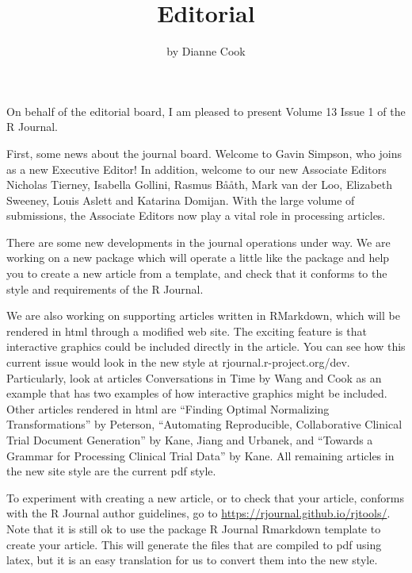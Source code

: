 \title{Editorial}


\author{by Dianne Cook}

\maketitle


On behalf of the editorial board, I am pleased to present Volume 13 Issue 1 of the R Journal.

First, some news about the journal board. Welcome to Gavin Simpson, who joins as a new Executive Editor! In addition, welcome to our new Associate Editors Nicholas Tierney, Isabella Gollini, Rasmus B\r{a}\r{a}th, Mark van der Loo, Elizabeth Sweeney, Louis Aslett and Katarina Domijan. With the large volume of submissions, the Associate Editors now play a vital role in processing articles.

There are some new developments in the journal operations under way. We are working on a new package  which will operate a little like the  package and help you to create a new article from a template, and check that it conforms to the style and requirements of the R Journal.

We are also working on supporting articles written in RMarkdown, which will be rendered in html through a modified  web site. The exciting feature is that interactive graphics could be included directly in the article. You can see how this current issue would look in the new style at rjournal.r-project.org/dev. Particularly, look at articles Conversations in Time by Wang and Cook as an example that has two examples of how interactive graphics might be included. Other articles rendered in html are ``Finding Optimal Normalizing Transformations'' by Peterson, ``Automating Reproducible, Collaborative
Clinical Trial Document Generation'' by Kane, Jiang and Urbanek, and ``Towards a Grammar for Processing Clinical Trial Data'' by Kane. All remaining articles in the new site style are the current pdf style.

To experiment with creating a new article, or to check that your article, conforms with the R Journal author guidelines, go to \url{https://rjournal.github.io/rjtools/}. Note that it is still ok to use the  package R Journal Rmarkdown template to create your article. This will generate the files that are compiled to pdf using latex, but it is an easy translation for us to convert them into the new style.

